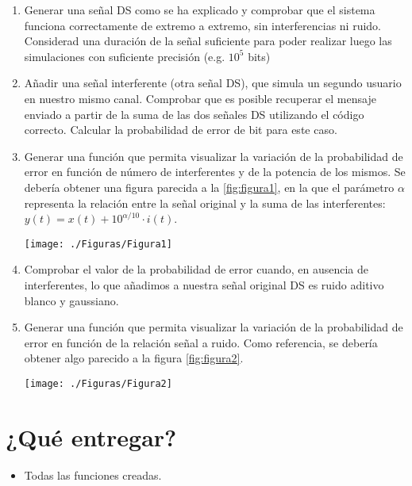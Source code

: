 \documentclass[es,practica]{uah}
\begin{document}
\begin{enumerate}
	\item Generar una señal DS como se ha explicado y comprobar que el sistema funciona correctamente de extremo a extremo, sin interferencias ni ruido. Considerad una duración de la señal suficiente para poder realizar luego las simulaciones con suficiente precisión (e.g. $10^5$ bits)
	\item Añadir una señal interferente (otra señal DS), que simula un segundo usuario en nuestro mismo canal. Comprobar que es posible recuperar el mensaje enviado a partir de la suma de las dos señales DS utilizando el código correcto. Calcular la probabilidad de error de bit para este caso. 
	\item Generar una función que permita visualizar la variación de la probabilidad de error en función de número de interferentes y de la potencia de los mismos. Se debería obtener una figura parecida a la \ref{fig:figura1}, en la que el parámetro $\alpha$ representa la relación entre la señal original y la suma de las interferentes: $y(t) = x(t) + 10^{\alpha/10}\cdot i(t)$.
	

	\begin{figure*}[h!]
		\centering\texttt{[image: ./Figuras/Figura1]}
		\caption{Salida de ejemplo para el apartado 3}
		\label{fig:figura1}
	\end{figure*}


	\item Comprobar el valor de la probabilidad de error cuando, en ausencia de interferentes, lo que añadimos a nuestra señal original DS es ruido aditivo blanco y gaussiano.
	\item Generar una función que permita visualizar la variación de la probabilidad de error en función de la relación señal a ruido. Como referencia, se debería obtener algo parecido a la figura \ref{fig:figura2}.
	
	\begin{figure*}[h!]
		\centering\texttt{[image: ./Figuras/Figura2]}
		\caption{Salida de ejemplo para el apartado 5}
		\label{fig:figura2}
	\end{figure*}

\end{enumerate}


\section{¿Qué entregar?}
\begin{itemize}
	\item Todas las funciones creadas.
\end{itemize}


\end{document}
